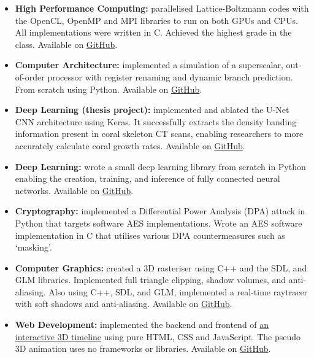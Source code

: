 \vspace{-1.1em}


\vspace{0.2em}

\begin{cvparagraph}

\begin{itemize}[leftmargin=*]
    \itemsep-0.6em
    \item {\textbf{High Performance Computing:} parallelised Lattice-Boltzmann codes with the OpenCL, OpenMP and MPI libraries to run on both GPUs and CPUs. All implementations were written in C. Achieved the highest grade in the class. Available on \href{https://github.com/ainsleyrutterford/HPC-OpenCL}{GitHub}.}
    \item {\textbf{Computer Architecture:} implemented a simulation of a superscalar, out-of-order processor with register renaming and dynamic branch prediction. From scratch using Python. Available on \href{https://github.com/ainsleyrutterford/Superscalar}{GitHub}.}
    \item{\textbf{Deep Learning (thesis project):} implemented and ablated the U-Net CNN architecture using Keras. It successfully extracts the density banding information present in coral skeleton CT scans, enabling researchers to more accurately calculate coral growth rates. Available on \href{https://github.com/ainsleyrutterford/Thesis}{GitHub}.}
    \item{\textbf{Deep Learning:} wrote a small deep learning library from scratch in Python enabling the creation, training, and inference of fully connected neural networks. Available on \href{https://github.com/ainsleyrutterford/tinyNet}{GitHub}.}
    \item {\textbf{Cryptography:} implemented a Differential Power Analysis (DPA) attack in Python that targets software AES implementations. Wrote an AES software implementation in C that utilises various DPA countermeasures such as ‘masking’.}
    \item {\textbf{Computer Graphics:} created a 3D rasteriser using C++ and the SDL, and GLM libraries. Implemented full triangle clipping, shadow volumes, and anti-aliasing. Also using C++, SDL, and GLM, implemented a real-time raytracer with soft shadows and anti-aliasing. Available on \href{https://github.com/ainsleyrutterford/Rasteriser}{GitHub}.}
    \item {\textbf{Web Development:} implemented the backend and frontend of \href{https://timeline.wang}{an interactive 3D timeline} using pure HTML, CSS and JavaScript. The pseudo 3D animation uses no frameworks or libraries. Available on \href{https://github.com/ainsleyrutterford/timeline.wang}{GitHub}.}
\end{itemize}

\end{cvparagraph}
